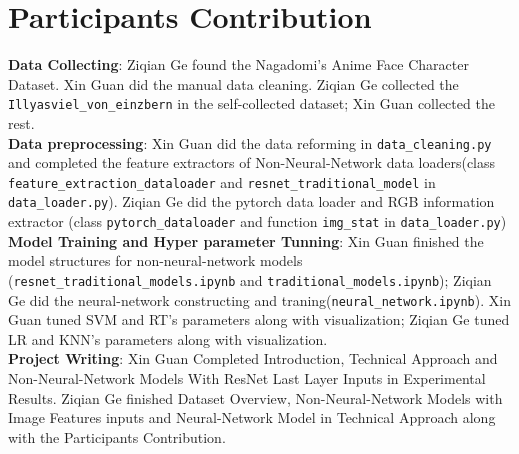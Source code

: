\documentclass[11.5pt]{article}
\begin{document}
    \section{Participants Contribution}
    \textbf{Data Collecting}: Ziqian Ge found the Nagadomi's Anime Face Character Dataset. Xin Guan did the manual data cleaning. Ziqian Ge collected the \texttt{Illyasviel\_von\_einzbern} in the self-collected dataset; Xin Guan collected the rest. \\
    \textbf{Data preprocessing}: Xin Guan did the data reforming in \texttt{data\_cleaning.py} and completed the feature extractors of Non-Neural-Network data loaders(class \texttt{feature\_extraction\_dataloader} and \texttt{resnet\_traditional\_model} in \texttt{data\_loader.py}). Ziqian Ge did the pytorch data loader and RGB information extractor (class \texttt{pytorch\_dataloader} and function \texttt{img\_stat} in \texttt{data\_loader.py}) \\
    \textbf{Model Training and Hyper parameter Tunning}: Xin Guan finished the model structures for non-neural-network models (\texttt{resnet\_traditional\_models.ipynb} and \texttt{traditional\_models.ipynb}); Ziqian Ge did the neural-network constructing and traning(\texttt{neural\_network.ipynb}). Xin Guan tuned SVM and RT's parameters along with visualization; Ziqian Ge tuned LR and KNN's parameters along with visualization. \\
    \textbf{Project Writing}: Xin Guan Completed Introduction, Technical Approach and Non-Neural-Network Models With ResNet Last Layer Inputs in Experimental Results. Ziqian Ge finished Dataset Overview, Non-Neural-Network Models with Image Features inputs and Neural-Network Model in Technical Approach along with the Participants Contribution.
    \vspace{10mm}


    \newpage
    
    {}
    

    
\end{document}
